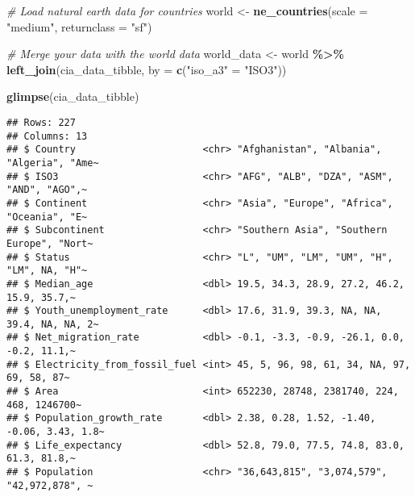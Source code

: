 \documentclass[
]{article}
\newenvironment{Shaded}{\begin{snugshade}}{\end{snugshade}}
\newcommand{\AttributeTok}[1]{\textcolor[rgb]{0.13,0.29,0.53}{#1}}
\newcommand{\CommentTok}[1]{\textcolor[rgb]{0.56,0.35,0.01}{\textit{#1}}}
\newcommand{\FunctionTok}[1]{\textcolor[rgb]{0.13,0.29,0.53}{\textbf{#1}}}
\newcommand{\NormalTok}[1]{#1}
\newcommand{\OtherTok}[1]{\textcolor[rgb]{0.56,0.35,0.01}{#1}}
\newcommand{\SpecialCharTok}[1]{\textcolor[rgb]{0.81,0.36,0.00}{\textbf{#1}}}
\newcommand{\StringTok}[1]{\textcolor[rgb]{0.31,0.60,0.02}{#1}}
\begin{document}
\begin{Shaded}
\begin{Highlighting}[]
\CommentTok{\# Load natural earth data for countries}
\NormalTok{world }\OtherTok{\textless{}{-}} \FunctionTok{ne\_countries}\NormalTok{(}\AttributeTok{scale =} \StringTok{"medium"}\NormalTok{, }\AttributeTok{returnclass =} \StringTok{"sf"}\NormalTok{)}

\CommentTok{\# Merge your data with the world data}
\NormalTok{world\_data }\OtherTok{\textless{}{-}}\NormalTok{ world }\SpecialCharTok{\%\textgreater{}\%}
  \FunctionTok{left\_join}\NormalTok{(cia\_data\_tibble, }\AttributeTok{by =} \FunctionTok{c}\NormalTok{(}\StringTok{"iso\_a3"} \OtherTok{=} \StringTok{"ISO3"}\NormalTok{))}


\FunctionTok{glimpse}\NormalTok{(cia\_data\_tibble)}
\end{Highlighting}
\end{Shaded}

\begin{verbatim}
## Rows: 227
## Columns: 13
## $ Country                      <chr> "Afghanistan", "Albania", "Algeria", "Ame~
## $ ISO3                         <chr> "AFG", "ALB", "DZA", "ASM", "AND", "AGO",~
## $ Continent                    <chr> "Asia", "Europe", "Africa", "Oceania", "E~
## $ Subcontinent                 <chr> "Southern Asia", "Southern Europe", "Nort~
## $ Status                       <chr> "L", "UM", "LM", "UM", "H", "LM", NA, "H"~
## $ Median_age                   <dbl> 19.5, 34.3, 28.9, 27.2, 46.2, 15.9, 35.7,~
## $ Youth_unemployment_rate      <dbl> 17.6, 31.9, 39.3, NA, NA, 39.4, NA, NA, 2~
## $ Net_migration_rate           <dbl> -0.1, -3.3, -0.9, -26.1, 0.0, -0.2, 11.1,~
## $ Electricity_from_fossil_fuel <int> 45, 5, 96, 98, 61, 34, NA, 97, 69, 58, 87~
## $ Area                         <int> 652230, 28748, 2381740, 224, 468, 1246700~
## $ Population_growth_rate       <dbl> 2.38, 0.28, 1.52, -1.40, -0.06, 3.43, 1.8~
## $ Life_expectancy              <dbl> 52.8, 79.0, 77.5, 74.8, 83.0, 61.3, 81.8,~
## $ Population                   <chr> "36,643,815", "3,074,579", "42,972,878", ~
\end{verbatim}
\end{document}
